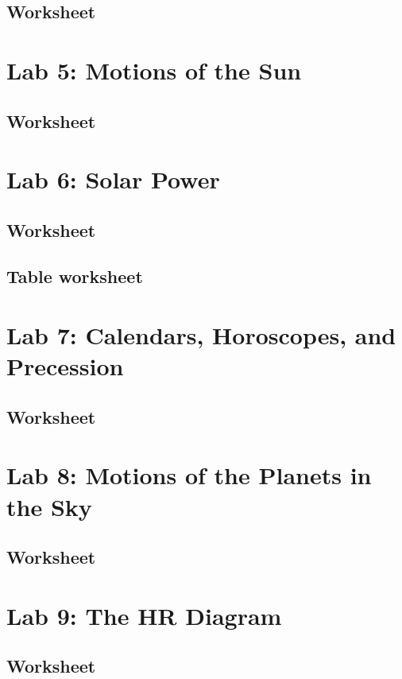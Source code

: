 \documentclass[12pt]{article}
\begin{document}
\subsection{Worksheet}

\newpage

\section{Lab 5: Motions of the Sun}
\subsection{Worksheet}

\newpage

\section{Lab 6: Solar Power}
\subsection{Worksheet}

\newpage
\subsection{Table worksheet}
\newpage

\section{Lab 7: Calendars, Horoscopes, and Precession}
\subsection{Worksheet}
%
\newpage

\section{Lab 8: Motions of the Planets in the Sky}
\subsection{Worksheet}
%
\newpage

\section{Lab 9: The HR Diagram}
\subsection{Worksheet}

\newpage
\end{document}

